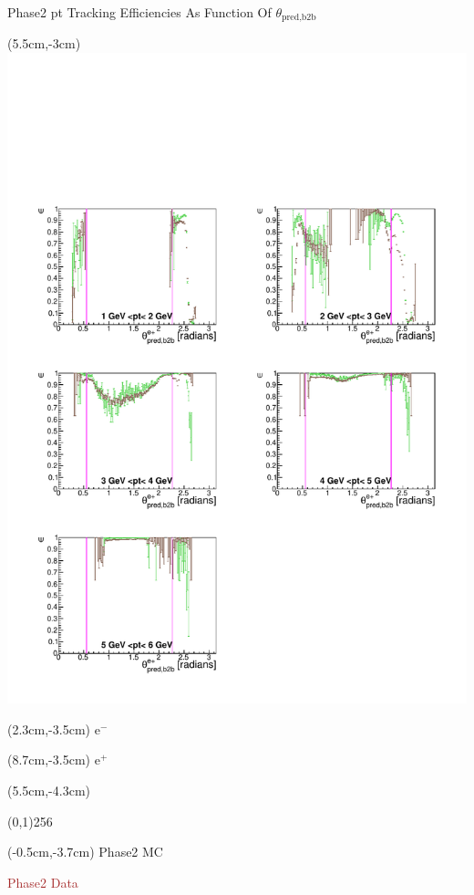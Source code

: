 \documentclass[8pt]{beamer}
\begin{document}
\begin{frame}{Phase2 pt Tracking Efficiencies As Function Of $\theta_{\textrm{pred,b2b}}$}
	\begin{textblock*}{6.5cm}(5.5cm,-3cm)
		\includegraphics[width=\textwidth]{VPlots/P2/xPtMThetaep}
	\end{textblock*}
	
	
	\begin{textblock*}{2cm}(2.3cm,-3.5cm)
		$\textrm{e}^-$
	\end{textblock*}
	
	\begin{textblock*}{2cm}(8.7cm,-3.5cm)
		$\textrm{e}^+$
	\end{textblock*}
	
	
	
	\begin{textblock*}{11cm}(5.5cm,-4.3cm)
		
		\begin{center}
			\line(0,1){256}
		\end{center}
		
	\end{textblock*}
	
	\begin{textblock*}{4cm}(-0.5cm,-3.7cm)
		\textcolor{OliveGreen}{Phase2 MC}
		
		\textcolor{brown}{Phase2 Data}
	\end{textblock*}
	
	
	
	
	
\end{frame}
\end{document}
